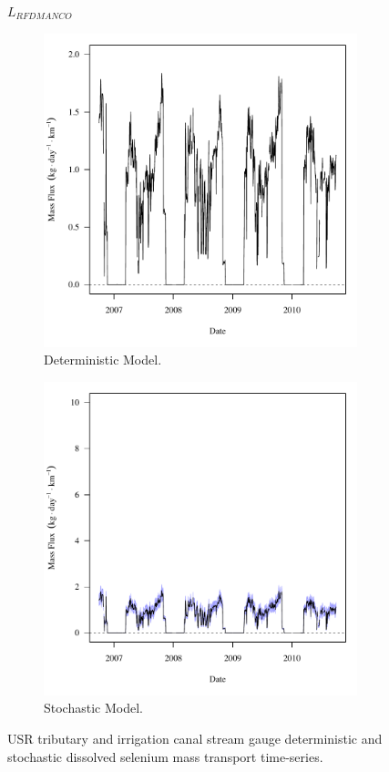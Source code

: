 \subfiguremid
\begin{landscape}
	\begin{figure}
		$ \displaystyle L_{RFDMANCO} $
		\begin{subfigure}{0.7\textwidth}
			\centering
			\includegraphics[width=\tableCustomSize]{"Figures/Results_USR/Deterministic/f RFD"}
			\caption{Deterministic Model.}
		\end{subfigure}%
		\begin{subfigure}{0.7\textwidth}
			\centering
			\includegraphics[width=\tableCustomSize]{"Figures/Results_USR/Stochastic/f RFD"}
			\caption{Stochastic Model.}
		\end{subfigure}
		\caption{USR tributary and irrigation canal stream gauge deterministic and stochastic dissolved selenium mass transport time-series.}
	\end{figure}
\end{landscape}
